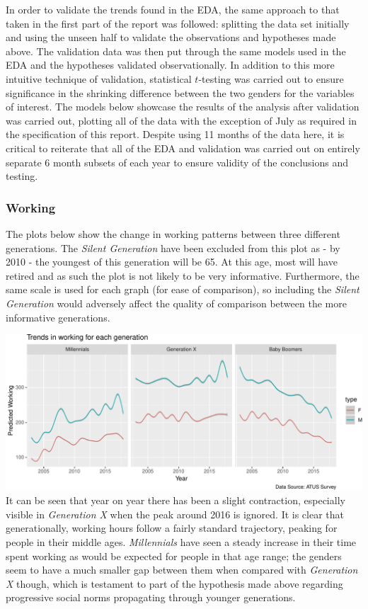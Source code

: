 \documentclass[11pt,]{article}
\begin{document}
In order to validate the trends found in the EDA, the same approach to
that taken in the first part of the report was followed: splitting the
data set initially and using the unseen half to validate the
observations and hypotheses made above. The validation data was then put
through the same models used in the EDA and the hypotheses validated
observationally. In addition to this more intuitive technique of
validation, statistical \(t\)-testing was carried out to ensure
significance in the shrinking difference between the two genders for the
variables of interest. The models below showcase the results of the
analysis after validation was carried out, plotting all of the data with
the exception of July as required in the specification of this report.
Despite using 11 months of the data here, it is critical to reiterate
that all of the EDA and validation was carried out on entirely separate
6 month subsets of each year to ensure validity of the conclusions and
testing.

\hypertarget{working}{%
\subsubsection{Working}\label{working}}

The plots below show the change in working patterns between three
different generations. The \emph{Silent Generation} have been excluded
from this plot as - by 2010 - the youngest of this generation will be
65. At this age, most will have retired and as such the plot is not
likely to be very informative. Furthermore, the same scale is used for
each graph (for ease of comparison), so including the \emph{Silent
Generation} would adversely affect the quality of comparison between the
more informative generations.

\includegraphics{Final-Report_files/figure-latex/unnamed-chunk-4-1} It
can be seen that year on year there has been a slight contraction,
especially visible in \emph{Generation X} when the peak around 2016 is
ignored. It is clear that generationally, working hours follow a fairly
standard trajectory, peaking for people in their middle ages.
\emph{Millennials} have seen a steady increase in their time spent
working as would be expected for people in that age range; the genders
seem to have a much smaller gap between them when compared with
\emph{Generation X} though, which is testament to part of the hypothesis
made above regarding progressive social norms propagating through
younger generations.
\end{document}
